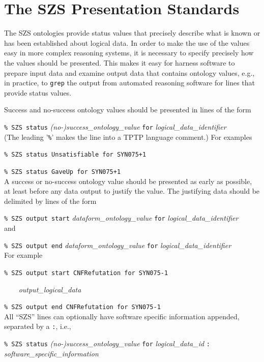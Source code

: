 \documentclass[a4paper]{easychair}
\begin{document}
\section{The SZS Presentation Standards}
\label{Presenting}

The SZS ontologies provide status values that precisely describe what is
known or has been established about logical data.
In order to make the use of the values easy in more complex reasoning
systems, it is necessary to specify precisely how the values should be
presented.
This makes it easy for harness software to prepare input data and examine
output data that contains ontology values, e.g., in practice, to {\tt grep}
the output from automated reasoning software for lines that provide status
values.

Success and no-success ontology values should be presented in lines of
the form

{\tt \% SZS status} {\em (no-)success\_ontology\_value} {\tt for} {\em logical\_data\_identifier}\\
(The leading '{\tt \%}' makes the line into a TPTP language comment.)
For examples

{\tt \% SZS status Unsatisfiable for SYN075+1}

{\tt \% SZS status GaveUp for SYN075+1}\\

A success or no-success ontology value should be presented as early as 
possible, at least before any data output to justify the value.
The justifying data should be delimited by lines of the form

{\tt \% SZS output start} {\em dataform\_ontology\_value} {\tt for} {\em logical\_data\_identifier}\\
and

{\tt \% SZS output end} {\em dataform\_ontology\_value} {\tt for} {\em logical\_data\_identifier}\\
For example

{\tt \% SZS output start CNFRefutation for SYN075-1}

{\tt ~~~~}{\em output\_logical\_data}

{\tt \% SZS output end CNFRefutation for SYN075-1}\\

All ``SZS'' lines can optionally have software specific information
appended, separated by a {\tt :}, i.e.,

{\tt \% SZS status} {\em (no-)success\_ontology\_value} {\tt for} {\em logical\_data\_id} {\tt :} {\em software\_specific\_information}
\end{document}
